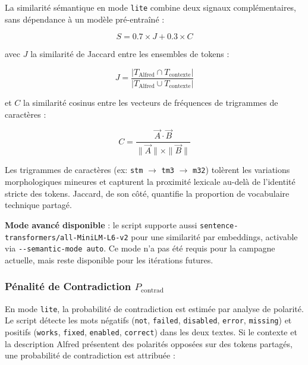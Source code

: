 \documentclass[12pt,a4paper]{report}
\begin{document}
La similarité sémantique en mode \texttt{lite} combine deux signaux complémentaires, sans dépendance à un modèle pré-entraîné :

\begin{equation}
S = 0.7 \times J + 0.3 \times C
\label{eq:alfred_semantic_lite}
\end{equation}

avec $J$ la similarité de Jaccard entre les ensembles de tokens :

\begin{equation}
J =
\frac{|T_{\text{Alfred}} \cap T_{\text{contexte}}|}
{|T_{\text{Alfred}} \cup T_{\text{contexte}}|}
\label{eq:alfred_jaccard}
\end{equation}

et $C$ la similarité cosinus entre les vecteurs de fréquences de trigrammes de caractères :

\begin{equation}
C =
\frac{\vec{A} \cdot \vec{B}}{\|\vec{A}\| \times \|\vec{B}\|}
\label{eq:alfred_trigram_cosine}
\end{equation}

Les trigrammes de caractères (ex: \texttt{stm} $\to$ \texttt{tm3} $\to$ \texttt{m32}) tolèrent les variations morphologiques mineures et capturent la proximité lexicale au-delà de l'identité stricte des tokens. Jaccard, de son côté, quantifie la proportion de vocabulaire technique partagé.

\textbf{Mode avancé disponible} : le script supporte aussi \texttt{sentence-transformers/all-MiniLM-L6-v2} \cite{reimers2019sentence} pour une similarité par embeddings, activable via \texttt{-{}-semantic-mode auto}. Ce mode n'a pas été requis pour la campagne actuelle, mais reste disponible pour les itérations futures.

\subsubsection{Pénalité de Contradiction $P_{\text{contrad}}$}

En mode \texttt{lite}, la probabilité de contradiction est estimée par analyse de polarité. Le script détecte les mots négatifs (\texttt{not}, \texttt{failed}, \texttt{disabled}, \texttt{error}, \texttt{missing}) et positifs (\texttt{works}, \texttt{fixed}, \texttt{enabled}, \texttt{correct}) dans les deux textes. Si le contexte et la description Alfred présentent des polarités opposées sur des tokens partagés, une probabilité de contradiction est attribuée :
\end{document}
